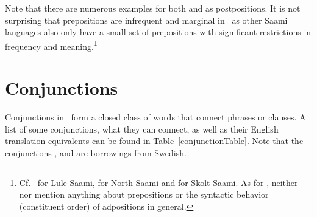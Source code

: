 Note that there are numerous examples for both  and  as postpositions. 
It is not surprising that prepositions are infrequent and marginal in \PS\ as other Saami languages also only have a small set of prepositions with significant restrictions in frequency and meaning.\footnote{Cf.~\citet[91-92]{Spiik1989} for Lule Saami, \citet[84-85]{Svonni2009} for North Saami and \citet[314-317]{Feist2010} for Skolt Saami. As for \PS, neither \citet{Lagercrantz1926} nor \citet{Lehtiranta1992} mention anything about prepositions or the syntactic behavior (constituent order) of adpositions in general.} %



\section{Conjunctions}\label{conjunctions}
Conjunctions in \PS\ form a closed class of words that connect phrases or clauses. A list of some conjunctions, what they can connect, as well as their English translation equivalents can be found in Table~\vref{conjunctionTable}. Note that the conjunctions ,  and  are borrowings from Swedish. 
